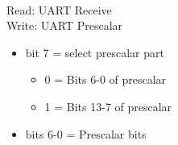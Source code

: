 \\
Read: UART Receive\\
Write: UART Prescalar
\begin{itemize}
\item[] bit 7 = select prescalar part
  \begin{itemize}
  \item[] 0 = Bits 6-0 of prescalar
  \item[] 1 = Bits 13-7 of prescalar
  \end{itemize}
\item[] bits 6-0 = Prescalar bits
\end{itemize}

